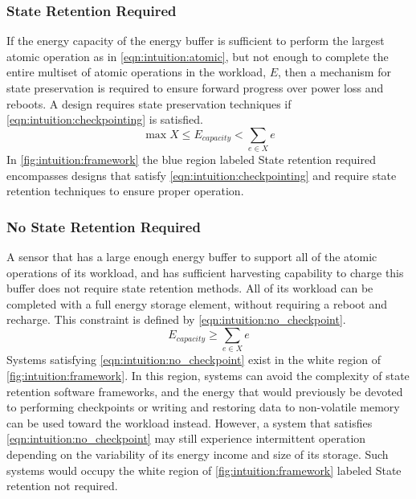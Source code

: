 \subsubsection{State Retention Required}
If the energy capacity of the energy buffer
is sufficient to perform the largest atomic operation as in \cref{eqn:intuition:atomic}, but
not enough to complete
the entire multiset of atomic operations in the workload, $E$,
then a mechanism for state preservation is required to ensure forward progress over power loss and reboots.
A design requires state preservation techniques if \cref{eqn:intuition:checkpointing} is satisfied.
\begin{equation}
    \label{eqn:intuition:checkpointing}
    \max X \leq E_{capacity} < \sum_{e \in X} e
\end{equation}
In \cref{fig:intuition:framework} the blue region labeled \textsf{State retention required} encompasses designs that satisfy \cref{eqn:intuition:checkpointing} and require state retention techniques to ensure proper operation.

\subsubsection{No State Retention Required}
A sensor that has a large enough energy buffer to support all of the atomic operations of its workload, and has sufficient harvesting capability to charge this buffer does not require state retention methods. All of its workload can be completed with a full energy storage element, without requiring a reboot and recharge.
This constraint is defined by \cref{eqn:intuition:no_checkpoint}.
\begin{equation}
    \label{eqn:intuition:no_checkpoint}
    E_{capacity} \geq \sum_{e \in X} e
\end{equation}
Systems satisfying \cref{eqn:intuition:no_checkpoint} exist in the white region of \cref{fig:intuition:framework}.
In this region, systems can avoid the complexity of state retention software frameworks, and the energy that would previously be devoted to performing checkpoints or writing and restoring data to non-volatile memory can be used toward the workload instead.
However, a system that satisfies \cref{eqn:intuition:no_checkpoint} may still experience intermittent operation depending on the variability of its energy income and size of its storage. Such systems would occupy the white region of \cref{fig:intuition:framework} labeled \textsf{State retention not required}.

